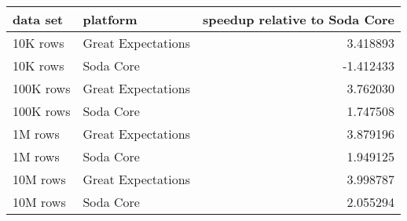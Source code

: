 \begin{tabular}{llr}
\toprule
data set & platform & speedup relative to Soda Core \\
\midrule
10K rows & Great Expectations & 3.418893 \\
10K rows & Soda Core & -1.412433 \\
100K rows & Great Expectations & 3.762030 \\
100K rows & Soda Core & 1.747508 \\
1M rows & Great Expectations & 3.879196 \\
1M rows & Soda Core & 1.949125 \\
10M rows & Great Expectations & 3.998787 \\
10M rows & Soda Core & 2.055294 \\
\bottomrule
\end{tabular}
